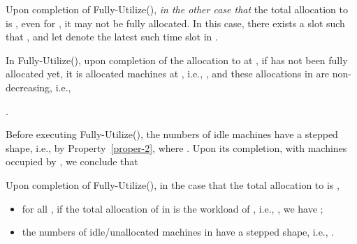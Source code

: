 \documentclass[10pt,journal,compsoc]{IEEEtran}
\begin{document}
Upon completion of Fully-Utilize(), {\em in the other case that} the total allocation to  is , even for , it may not be fully allocated. In this case, there exists a slot  such that , and let  denote the latest such time slot in .


In Fully-Utilize(), upon completion of the allocation to  at , if  has not been fully allocated yet, it is allocated  machines at , i.e., , and these allocations in  are non-decreasing, i.e.,
\begin{center}
.
\end{center}
Before executing Fully-Utilize(), the numbers of idle machines have a stepped shape, i.e.,  by Property~\ref{proper-2}, where . Upon its completion, with  machines occupied by , we conclude that





\begin{lemma}\label{lemma-fully-utilize}
Upon completion of Fully-Utilize(), in the case that the total allocation to  is ,
\begin{itemize}
 \setlength\itemsep{0.3em}
  \item for all , if the total allocation of  in  is  the workload of , i.e.,  , we have ;

  \item the numbers of idle/unallocated machines in  have a stepped shape, i.e., .
\end{itemize}
\end{lemma}
\end{document}
